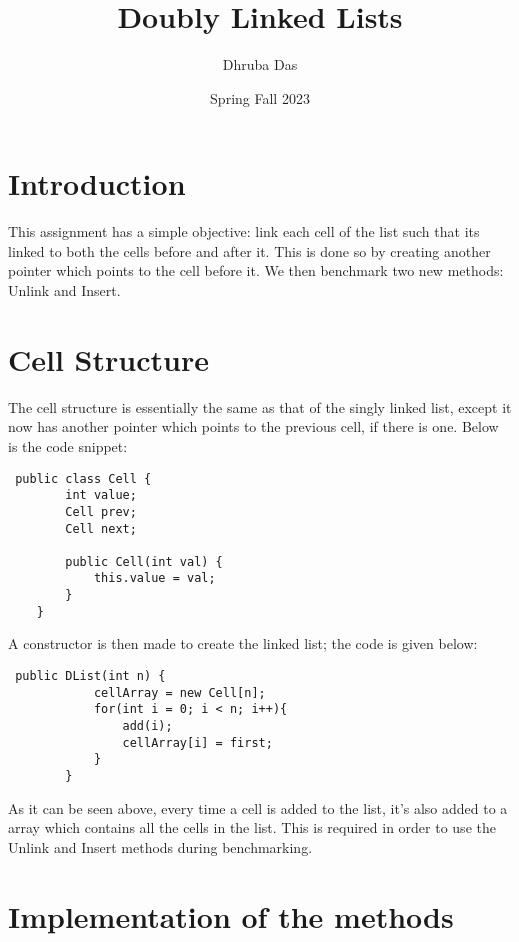 \documentclass[a4paper,11pt]{article}
\begin{document}
\title{
    \textbf{Doubly Linked Lists}
}
\author{Dhruba Das}
\date{Spring Fall 2023}

\maketitle

\section*{Introduction}
This assignment has a simple objective: link each cell of the list such that its linked to both the cells before and after it. This is done so by creating another pointer which points to the cell before it. We then benchmark two new methods: Unlink and Insert.

\section*{Cell Structure}

The cell structure is essentially the same as that of the singly linked list, except it now has another pointer which points to the previous cell, if there is one. Below is the code snippet:

\begin{verbatim}
 public class Cell {
        int value;
        Cell prev;
        Cell next;
    
        public Cell(int val) {
            this.value = val;
        }
    }   
\end{verbatim}


A constructor is then made to create the linked list; the code is given below:
\begin{verbatim}
 public DList(int n) {
            cellArray = new Cell[n];
            for(int i = 0; i < n; i++){
                add(i);
                cellArray[i] = first;
            }
        }
\end{verbatim}
As it can be seen above, every time a cell is added to the list, it's also added to a array which contains all the cells in the list. This is required in order to use the Unlink and Insert methods during benchmarking.


\section*{Implementation of the methods}
\end{document}
